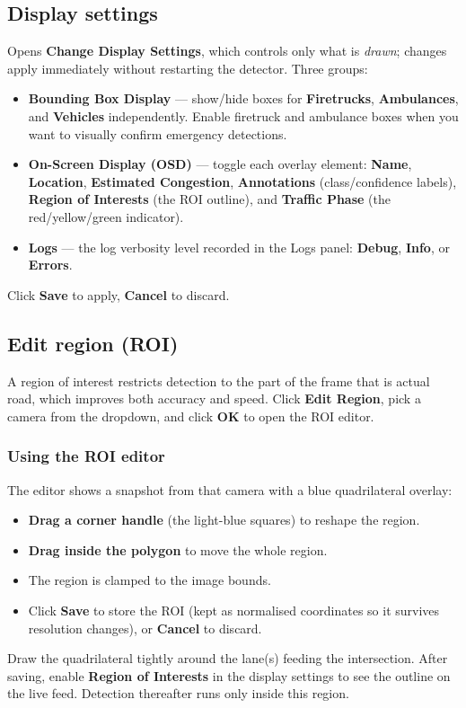 \documentclass[11pt]{article}
\newcommand{\ui}[1]{\textbf{#1}}
\begin{document}
\subsection{Display settings}
\label{sec:display}
Opens \ui{Change Display Settings}, which controls only what is \emph{drawn};
changes apply immediately without restarting the detector. Three groups:

\begin{itemize}[nosep]
  \item \ui{Bounding Box Display} --- show/hide boxes for \ui{Firetrucks},
        \ui{Ambulances}, and \ui{Vehicles} independently. Enable firetruck and
        ambulance boxes when you want to visually confirm emergency detections.
  \item \ui{On-Screen Display (OSD)} --- toggle each overlay element:
        \ui{Name}, \ui{Location}, \ui{Estimated Congestion}, \ui{Annotations}
        (class/confidence labels), \ui{Region of Interests} (the ROI outline),
        and \ui{Traffic Phase} (the red/yellow/green indicator).
  \item \ui{Logs} --- the log verbosity level recorded in the Logs panel:
        \ui{Debug}, \ui{Info}, or \ui{Errors}.
\end{itemize}
Click \ui{Save} to apply, \ui{Cancel} to discard.

\subsection{Edit region (ROI)}
\label{sec:roi}
A region of interest restricts detection to the part of the frame that is
actual road, which improves both accuracy and speed. Click \ui{Edit Region},
pick a camera from the dropdown, and click \ui{OK} to open the ROI editor.

\subsubsection{Using the ROI editor}
The editor shows a snapshot from that camera with a blue quadrilateral overlay:
\begin{itemize}[nosep]
  \item \textbf{Drag a corner handle} (the light-blue squares) to reshape the
        region.
  \item \textbf{Drag inside the polygon} to move the whole region.
  \item The region is clamped to the image bounds.
  \item Click \ui{Save} to store the ROI (kept as normalised coordinates so it
        survives resolution changes), or \ui{Cancel} to discard.
\end{itemize}
Draw the quadrilateral tightly around the lane(s) feeding the intersection.
After saving, enable \ui{Region of Interests} in the display settings to see the
outline on the live feed. Detection thereafter runs only inside this region.
\end{document}
